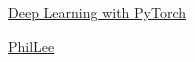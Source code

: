 \documentclass[11pt]{article}
\begin{document}
	\kaishu 
	\setcounter{section}{0}
	\begin{center}
		{\LARGE  \href{https://space.bilibili.com/1274695134/lists/2083514?type=season}{Deep Learning with PyTorch}}
		
		
		{\large \href{https://space.bilibili.com/1274695134}{PhilLee}}
	\end{center}
\setcounter{page}{1}

\end{document}
